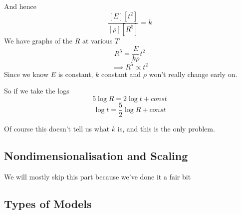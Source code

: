 \documentclass{X:/Documents/Coding/Latex/myassignment}
\begin{document}
And hence
\[\frac{[E][t^2]}{[\rho][R^5]} = k\]
We have graphs of the $R$ at various $T$
\[R^5 = \frac{E}{k\rho} t^2\]
\[\implies R^5 \propto t^2\]
Since we know $E$ is constant, $k$ constant and $\rho$ won't really change early on.

So if we take the logs
\[5\log R = 2\log t + const\]
\[\log t = \frac52 \log R + const\]

Of course this doesn't tell us what $k$ is, and this is the only problem.

\subsection{Nondimensionalisation and Scaling}
We will mostly skip this part because we've done it a fair bit


\subsection{Types of Models}
\end{document}
